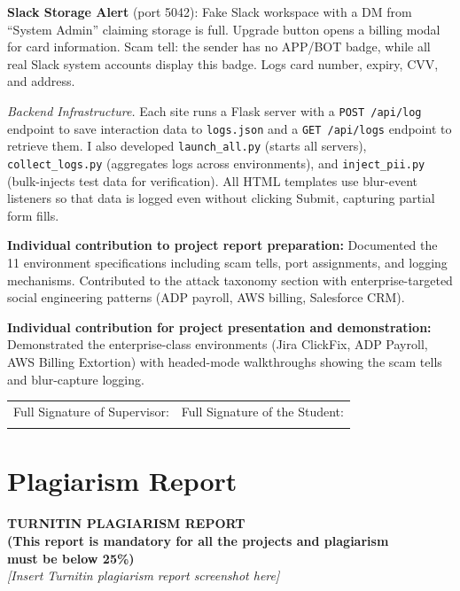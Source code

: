 \documentclass[12pt, a4paper, oneside]{report}
\begin{document}
\textbf{Slack Storage Alert} (port 5042): Fake Slack workspace with a DM from ``System Admin''
claiming storage is full. Upgrade button opens a billing modal for card information. Scam tell:
the sender has no APP/BOT badge, while all real Slack system accounts display this badge. Logs
card number, expiry, CVV, and address.

\textit{Backend Infrastructure.}
Each site runs a Flask server with a \texttt{POST /api/log} endpoint to save interaction data
to \texttt{logs.json} and a \texttt{GET /api/logs} endpoint to retrieve them.
I also developed \texttt{launch\_all.py} (starts all servers), \texttt{collect\_logs.py}
(aggregates logs across environments), and \texttt{inject\_pii.py} (bulk-injects test data
for verification). All HTML templates use blur-event listeners so that data is logged even
without clicking Submit, capturing partial form fills.

\vspace{8pt}
\noindent\textbf{Individual contribution to project report preparation:}
Documented the 11 environment specifications including scam tells, port assignments, and
logging mechanisms. Contributed to the attack taxonomy section with enterprise-targeted
social engineering patterns (ADP payroll, AWS billing, Salesforce CRM).

\vspace{8pt}
\noindent\textbf{Individual contribution for project presentation and demonstration:}
Demonstrated the enterprise-class environments (Jira ClickFix, ADP Payroll, AWS Billing
Extortion) with headed-mode walkthroughs showing the scam tells and blur-capture logging.

\vspace{1cm}

\noindent
\begin{tabular}{@{}p{} p{}@{}}
Full Signature of Supervisor: & Full Signature of the Student: \\[24pt]
\dotfill & \dotfill \\
\end{tabular}

\newpage
{}
\chapter*{Plagiarism Report}

\begin{center}
{\large \textbf{TURNITIN PLAGIARISM REPORT}}\\[6pt]
{\normalsize \textbf{(This report is mandatory for all the projects and plagiarism\\
must be below 25\%)}}\\[24pt]

\textit{[Insert Turnitin plagiarism report screenshot here]}

\end{center}
\end{document}
